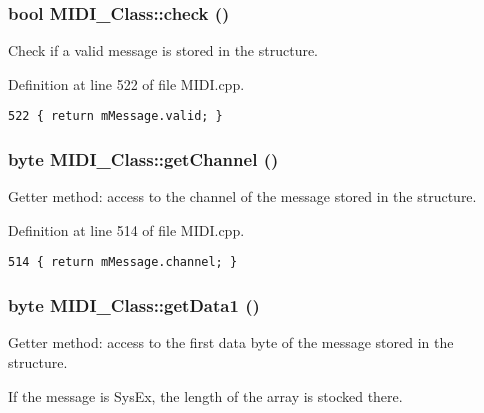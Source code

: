 \hypertarget{class_m_i_d_i___class_d5f7a96c5bb338946a0be1d243877155}{
\subsubsection[{check}]{\setlength{\rightskip}{0pt plus 5cm}bool MIDI\_\-Class::check ()}}
\label{class_m_i_d_i___class_d5f7a96c5bb338946a0be1d243877155}


Check if a valid message is stored in the structure. 

Definition at line 522 of file MIDI.cpp.

\begin{Code}\begin{verbatim}522 { return mMessage.valid; }
\end{verbatim}
\end{Code}


\hypertarget{class_m_i_d_i___class_6b7ac8309663b69decfd1bd2925fcbef}{
\subsubsection[{getChannel}]{\setlength{\rightskip}{0pt plus 5cm}byte MIDI\_\-Class::getChannel ()}}
\label{class_m_i_d_i___class_6b7ac8309663b69decfd1bd2925fcbef}


Getter method: access to the channel of the message stored in the structure. 

Definition at line 514 of file MIDI.cpp.

\begin{Code}\begin{verbatim}514 { return mMessage.channel; }
\end{verbatim}
\end{Code}


\hypertarget{class_m_i_d_i___class_a64038c767252e358decc469ba99d4e3}{
\subsubsection[{getData1}]{\setlength{\rightskip}{0pt plus 5cm}byte MIDI\_\-Class::getData1 ()}}
\label{class_m_i_d_i___class_a64038c767252e358decc469ba99d4e3}


Getter method: access to the first data byte of the message stored in the structure. \par
 If the message is SysEx, the length of the array is stocked there. 

